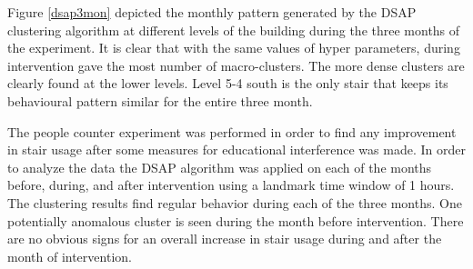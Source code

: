 Figure \ref{dsap3mon} depicted the monthly pattern generated by the DSAP clustering algorithm at different levels of the building during the three months of the experiment. It is clear that with the same values of hyper parameters, during intervention gave the most number of macro-clusters. The more dense clusters are clearly found at the lower levels. Level 5-4 south is the only stair that keeps its behavioural pattern similar for the entire three month.   

The people counter experiment was performed in order to find any improvement in stair usage after some measures for educational interference was made. In order to analyze the data the DSAP algorithm was applied on each of the months before, during, and after intervention using a landmark time window of 1 hours. The clustering results find regular behavior during each of the three months. One potentially anomalous cluster is seen during the month before intervention. There are no obvious signs for an overall increase in stair usage during and after the month of intervention.




















